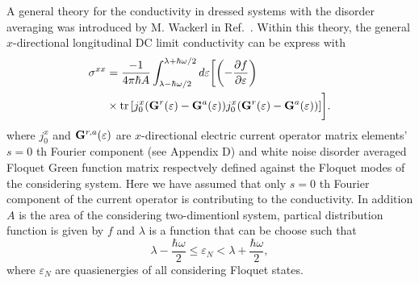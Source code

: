 A general theory for the conductivity in dressed systems with the disorder averaging was introduced by M. Wackerl in Ref.~\cite{wackerl20,wackerlthesis20}. Within this theory, the general $x$-directional longitudinal DC limit conductivity can be express with
\begin{equation} \label{eq_21}
  \begin{aligned}
    {\sigma}^{xx} &=
    \frac{-1}{4\pi\hbar A}
    \int_{\lambda-\hbar\omega/2}^{\lambda+ \hbar\omega/2} d\varepsilon \bigg[
    \qty(
    -\frac{\partial f}{\partial \varepsilon})
    \\
    & \times
    \tr
    \qty[
    {j}^x_0
    \qty(
    \vb{G}^{r} (\varepsilon) - \vb{G}^{a} (\varepsilon)
    )
    {j}^x_0
    \qty(
    \vb{G}^{r} (\varepsilon) - \vb{G}^{a} (\varepsilon)
    )
    ]\bigg].
  \end{aligned}
\end{equation}
where ${j}^x_0$ and $\vb{G}^{r,a} (\varepsilon)$ are $x$-directional electric current operator matrix elements' $s=0$ th Fourier component (see Appendix D) and white noise disorder averaged Floquet Green function matrix \cite{wackerl20,wackerlthesis20} respectvely defined against the Floquet modes of the considering system. Here we have assumed that only $s=0$ th Fourier component of the current operator is contributing to the conductivity. In addition $A$ is the area of the considering two-dimentionl system, partical distribution function is given by $f$ and $\lambda$ is a function that can be choose such that
\begin{equation} \label{eq_22}
    \lambda - \frac{\hbar \omega}{2}
    \leq \varepsilon_N
    <
    \lambda + \frac{\hbar \omega}{2},
\end{equation}
where $ \varepsilon_N$ are quasienergies of all considering Floquet states.

